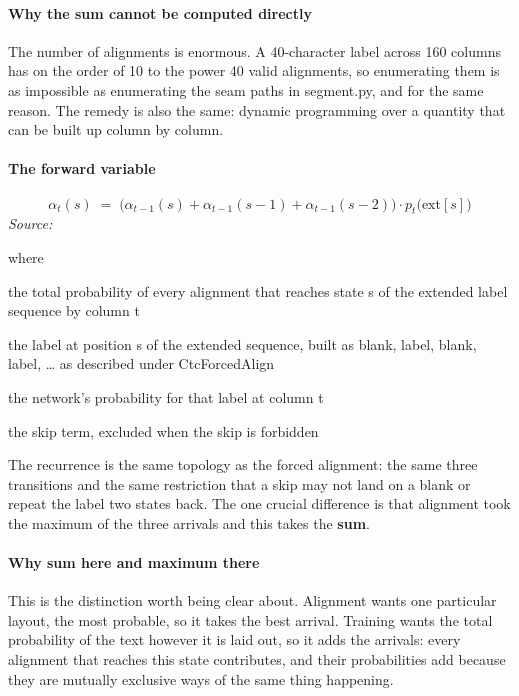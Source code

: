\paragraph{Why the sum cannot be computed directly}
The number of alignments is enormous. A 40-character label across 160 columns has on the order of 10 to the power 40 valid alignments, so enumerating them is as impossible as enumerating the seam paths in segment.py, and for the same reason. The remedy is also the same: dynamic programming over a quantity that can be built up column by column.


\paragraph{The forward variable}

\begin{equation}
\alpha_t(s) \;=\; \Big(\alpha_{t-1}(s) + \alpha_{t-1}(s-1) + \alpha_{t-1}(s-2)\Big) \cdot p_t\big(\mathrm{ext}[s]\big)
\end{equation}
\noindent\emph{Source: }\cite{graves2006}


\noindent where
\begin{description}[leftmargin=2.4em,style=nextline,font=\normalfont\ttfamily]\setlength\itemsep{1pt}
  \item[{$\alpha_t(s)$}] \normalfont the total probability of every alignment that reaches state s of the extended label sequence by column t
  \item[{$\mathrm{ext}[s]$}] \normalfont the label at position s of the extended sequence, built as blank, label, blank, label, … as described under CtcForcedAlign
  \item[{$p_t(\cdot)$}] \normalfont the network's probability for that label at column t
  \item[{$\alpha_{t-1}(s-2)$}] \normalfont the skip term, excluded when the skip is forbidden
\end{description}
The recurrence is the same topology as the forced alignment: the same three transitions and the same restriction that a skip may not land on a blank or repeat the label two states back. The one crucial difference is that alignment took the maximum of the three arrivals and this takes the \textbf{sum}.


\paragraph{Why sum here and maximum there}
This is the distinction worth being clear about. Alignment wants one particular layout, the most probable, so it takes the best arrival. Training wants the total probability of the text however it is laid out, so it adds the arrivals: every alignment that reaches this state contributes, and their probabilities add because they are mutually exclusive ways of the same thing happening.

